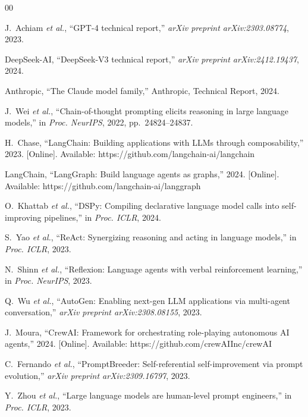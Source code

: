 \documentclass[conference]{IEEEtran}
\begin{document}
\begin{thebibliography}{00}

J.~Achiam \textit{et al.}, ``GPT-4 technical report,'' \textit{arXiv preprint arXiv:2303.08774}, 2023.

DeepSeek-AI, ``DeepSeek-V3 technical report,'' \textit{arXiv preprint arXiv:2412.19437}, 2024.

Anthropic, ``The Claude model family,'' Anthropic, Technical Report, 2024.

J.~Wei \textit{et al.}, ``Chain-of-thought prompting elicits reasoning in large language models,'' in \textit{Proc. NeurIPS}, 2022, pp.~24824--24837.

H.~Chase, ``LangChain: Building applications with LLMs through composability,'' 2023. [Online]. Available: https://github.com/langchain-ai/langchain

LangChain, ``LangGraph: Build language agents as graphs,'' 2024. [Online]. Available: https://github.com/langchain-ai/langgraph

O.~Khattab \textit{et al.}, ``DSPy: Compiling declarative language model calls into self-improving pipelines,'' in \textit{Proc. ICLR}, 2024.

S.~Yao \textit{et al.}, ``ReAct: Synergizing reasoning and acting in language models,'' in \textit{Proc. ICLR}, 2023.

N.~Shinn \textit{et al.}, ``Reflexion: Language agents with verbal reinforcement learning,'' in \textit{Proc. NeurIPS}, 2023.

Q.~Wu \textit{et al.}, ``AutoGen: Enabling next-gen LLM applications via multi-agent conversation,'' \textit{arXiv preprint arXiv:2308.08155}, 2023.

J.~Moura, ``CrewAI: Framework for orchestrating role-playing autonomous AI agents,'' 2024. [Online]. Available: https://github.com/crewAIInc/crewAI

C.~Fernando \textit{et al.}, ``PromptBreeder: Self-referential self-improvement via prompt evolution,'' \textit{arXiv preprint arXiv:2309.16797}, 2023.

Y.~Zhou \textit{et al.}, ``Large language models are human-level prompt engineers,'' in \textit{Proc. ICLR}, 2023.


\end{thebibliography}
\end{document}

